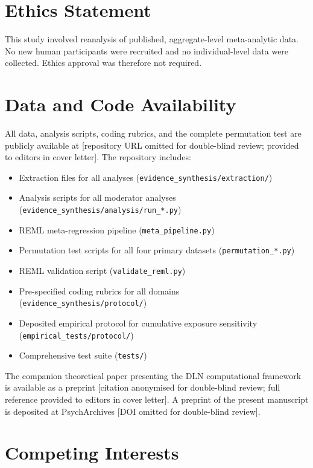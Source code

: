 \documentclass[11pt]{article}
\begin{document}
\clearpage
\section*{Ethics Statement}

This study involved reanalysis of published, aggregate-level
meta-analytic data. No new human participants were recruited and no
individual-level data were collected. Ethics approval was therefore
not required.


\section*{Data and Code Availability}

All data, analysis scripts, coding rubrics, and the complete
permutation test are publicly available at
[repository URL omitted for double-blind review; provided to editors
in cover letter]. The repository includes:
\begin{itemize}[nosep]
\item Extraction files for all analyses
(\texttt{evidence\_synthesis/extraction/})
\item Analysis scripts for all moderator analyses
(\texttt{evidence\_synthesis/analysis/run\_*.py})
\item REML meta-regression pipeline (\texttt{meta\_pipeline.py})
\item Permutation test scripts for all four primary datasets
(\texttt{permutation\_*.py})
\item REML validation script (\texttt{validate\_reml.py})
\item Pre-specified coding rubrics for all domains
(\texttt{evidence\_synthesis/protocol/})
\item Deposited empirical protocol for cumulative exposure sensitivity
(\texttt{empirical\_tests/protocol/})
\item Comprehensive test suite (\texttt{tests/})
\end{itemize}

\noindent The companion theoretical paper presenting the DLN
computational framework is available as a preprint
[citation anonymised for double-blind review; full reference
provided to editors in cover letter].
A preprint of the present manuscript is deposited at
PsychArchives [DOI omitted for double-blind review].


\section*{Competing Interests}
\end{document}
